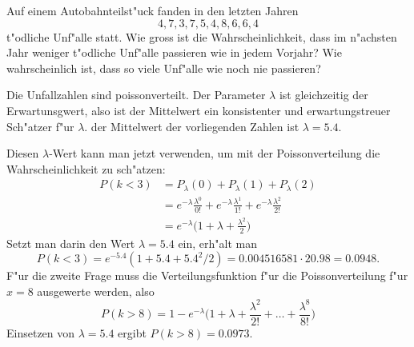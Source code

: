Auf einem Autobahnteilst"uck fanden in den letzten Jahren
\[
4, 7, 3, 7, 5, 4, 8, 6, 6, 4
\]
t"odliche Unf"alle statt.
Wie gross ist die Wahrscheinlichkeit, dass im n"achsten Jahr
weniger t"odliche Unf"alle passieren wie in jedem Vorjahr?
Wie wahrscheinlich ist, dass so viele Unf"alle wie noch nie
passieren?

\begin{loesung}
Die Unfallzahlen sind poissonverteilt.
Der Parameter $\lambda$ ist gleichzeitig der Erwartunsgwert, also
ist der Mittelwert ein konsistenter und erwartungstreuer Sch"atzer
f"ur $\lambda$. der Mittelwert der vorliegenden Zahlen ist $\lambda=5.4$.

Diesen $\lambda$-Wert kann man jetzt verwenden, um mit der Poissonverteilung
die Wahrscheinlichkeit zu sch"atzen:
\begin{align*}
P(k<3)&=
P_\lambda(0)
+
P_\lambda(1)
+
P_\lambda(2)
\\
&=
e^{-\lambda}\frac{\lambda^0}{0!}
+
e^{-\lambda}\frac{\lambda^1}{1!}
+
e^{-\lambda}\frac{\lambda^2}{2!}
\\
&=
e^{-\lambda}\biggl(1+\lambda+\frac{\lambda^2}{2}\biggr)
\end{align*}
Setzt man darin den Wert $\lambda=5.4$ ein, erh"alt man
\[
P(k<3)=e^{-5.4}(1+5.4+5.4^2/2)=0.004516581\cdot 20.98= 0.0948.
\]
F"ur die zweite Frage muss die Verteilungsfunktion f"ur die
Poissonverteilung f"ur $x=8$ ausgewerte werden, also
\[
P(k>8)=
1-e^{-\lambda}\biggl(
1+\lambda+\frac{\lambda^2}{2!}+\dots+\frac{\lambda^8}{8!}
\biggr)
\]
Einsetzen von $\lambda=5.4$ ergibt $P(k>8)=0.0973$.
\end{loesung}

